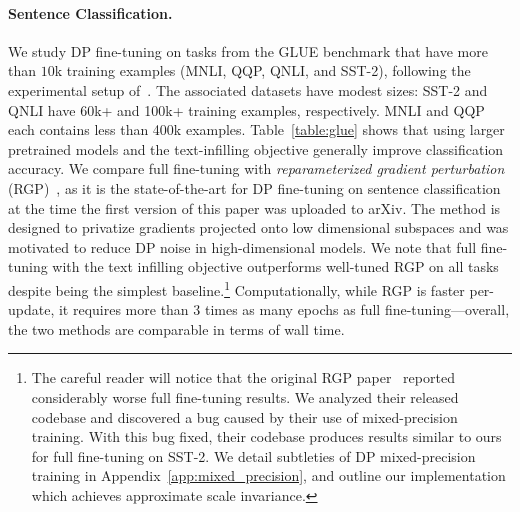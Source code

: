 \paragraph{Sentence Classification.}
We study DP fine-tuning on tasks from the GLUE benchmark that have more than $10$k training examples (MNLI, QQP, QNLI, and SST-2), following the experimental setup of~\cite{yu2021large}. 
The associated datasets have modest sizes: SST-2 and QNLI have 60k+ and 100k+ training examples, respectively. MNLI and QQP each contains less than 400k examples. 
Table~\ref{table:glue} shows that using larger pretrained models and the text-infilling objective generally improve classification accuracy. 
We compare full fine-tuning with \textit{reparameterized gradient perturbation} (RGP)~\citep{yu2021large}, as it is the state-of-the-art for DP fine-tuning on sentence classification at the time the first version of this paper was uploaded to arXiv. 
The method is designed to privatize gradients projected onto low dimensional subspaces and was motivated to reduce DP noise in high-dimensional models. 
We note that full fine-tuning with the text infilling objective outperforms well-tuned RGP on all tasks despite being the simplest baseline.\footnote{The careful reader will notice that the original RGP paper~\citep{yu2021large} reported considerably worse full fine-tuning results. We analyzed their released codebase and discovered a bug caused by their use of mixed-precision training. 
With this bug fixed, their codebase produces results similar to ours for full fine-tuning on SST-2. 
We detail subtleties of DP mixed-precision training in Appendix~\ref{app:mixed_precision}, and outline our implementation which achieves approximate scale invariance.
}
Computationally, while RGP is faster per-update, it requires more than 3 times as many epochs as full fine-tuning---overall, the two methods are comparable in terms of wall time. 



